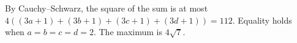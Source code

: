 By Cauchy--Schwarz, the square of the sum is at most $4((3a+1)+(3b+1)+(3c+1)+(3d+1))=112$. Equality holds when $a=b=c=d=2$. The maximum is $\boxed{4\sqrt7}$.
